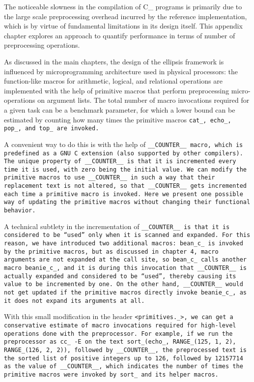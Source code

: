 The noticeable slowness in the compilation of C\_ programs is primarily due to
the large scale preprocessing overhead incurred by the reference implementation,
which is by virtue of fundamental limitations in its design itself.
This appendix chapter explores an approach to quantify
performance in terms of number of preprocessing operations.

As discussed in the main chapters, the design of the ellipsis framework
is influenced by microprogramming architecture used in physical processors:
the function-like macros for arithmetic, logical, and relational
operations are implemented with the help of primitive macros
that perform preprocessing micro-operations on argument lists.
The total number of macro invocations required for a given
task can be a benchmark parameter, for which a lower bound can
be estimated by counting how many times the primitive macros
\tt{cat_}, \tt{echo_}, \tt{pop_}, and \tt{top_} are invoked.

A convenient way to do this is with the help of \tt{__COUNTER__} macro,
which is predefined as a GNU C extension (also supported by other compilers).
The unique property of \tt{__COUNTER__} is that it is incremented
every time it is used, with zero being the initial value.
We can modify the primitive macros to use \tt{__COUNTER__} in
such a way that their replacement text is not altered, so that
\tt{__COUNTER__} gets incremented each time a primitive macro is invoked.
Here we present one possible way of updating the primitive
macros without changing their functional behavior.


A technical subtlety in the incrementation of \tt{__COUNTER__} is that
it is considered to be ``used'' only when it is scanned and expanded.
For this reason, we have introduced two additional macros:
\tt{bean_c_} is invoked by the primitive macros, but as discussed in chapter 4,
macro arguments are not expanded at the call site, so \tt{bean_c_}
calls another macro \tt{beanie_c_}, and it is during this invocation
that \tt{__COUNTER__} is actually expanded and considered to be ``used'',
thereby causing its value to be incremented by one.
On the other hand, \tt{__COUNTER__} would not get updated if the primitive macros
directly invoke \tt{beanie_c_}, as it does not expand its arguments at all.

With this small modification in the header \tt{<primitives._>},
we can get a conservative estimate of macro invocations
required for high-level operations done with the preprocessor.
For example, if we run the preprocessor as \tt{cc_ -E} on the
text \tt{sort_(echo_, RANGE_(125, 1, 2), RANGE_(126, 2, 2))},
followed by \tt{__COUNTER__}, the preprocessed text is the sorted
list of positive integers up to 126, followed by 12157714 as the
value of \tt{__COUNTER__}, which indicates the number of times the
primitive macros were invoked by \tt{sort_} and its helper macros.

